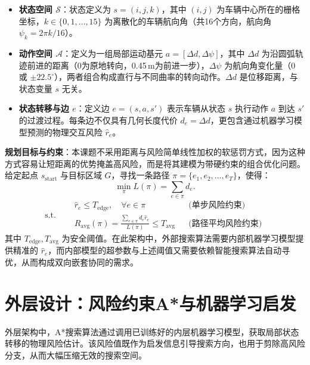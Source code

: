 \documentclass[12pt, a4paper]{article}
\begin{document}
\begin{itemize}
    \item \textbf{状态空间 \(\mathcal{S}\)}：状态定义为 \(s=(i, j, k)\)，其中 \((i,j)\) 为车辆中心所在的栅格坐标，\(k \in \{0, 1, \dots, 15\}\) 为离散化的车辆航向角（共16个方向，航向角 \(\psi_k = 2\pi k/16\)）。
    \item \textbf{动作空间 \(\mathcal{A}\)}：定义为一组局部运动基元 \(a = [\Delta d, \Delta \psi]\)，其中 \(\Delta d\) 为沿圆弧轨迹前进的距离（0为原地转向，0.45\,m为前进一步），\(\Delta \psi\) 为航向角变化量（\(0\) 或 \(\pm 22.5^{\circ}\)），两者组合构成直行与不同曲率的转向动作。\(\Delta d\) 是位移距离，与状态变量 \(s\) 无关。
    \item \textbf{状态转移与边 \(e\)}：定义边 \(e = (s, a, s')\) 表示车辆从状态 \(s\) 执行动作 \(a\) 到达 \(s'\) 的过渡过程。每条边不仅具有几何长度代价 \(d_e = \Delta d\)，更包含通过机器学习模型预测的物理交互风险 \(\hat{r}_e\)。
\end{itemize}

\textbf{规划目标与约束}：本课题不采用距离与风险简单线性加权的软惩罚方式，因为这种方式容易让短距离的优势掩盖高风险，而是将其建模为带硬约束的组合优化问题。给定起点 \(s_{\text{start}}\) 与目标区域 \(G\)，寻找一条路径 \(\pi = \{e_1, e_2, \dots, e_T\}\)，使得：
\begin{equation}
    \min_{\pi} L(\pi) = \sum_{e \in \pi} d_e.
\end{equation}
\[
\text{s.t.} \quad
\begin{aligned}
    &\hat{r}_e \le T_{\text{edge}}, \quad \forall e \in \pi &&\text{(单步风险约束)} \\
    &R_{\text{avg}}(\pi) = \frac{\sum_{e \in \pi} d_e \hat{r}_e}{L(\pi)} \le T_{\text{avg}} &&\text{(路径平均风险约束)}
\end{aligned}
\]
其中 \(T_{\text{edge}}, T_{\text{avg}}\) 为安全阈值。在此架构中，外部搜索算法需要内部机器学习模型提供精准的 \(\hat{r}_e\)，而内部模型的超参数与上述阈值又需要依赖智能搜索算法自动寻优，从而构成双向嵌套协同的需求。


\section{外层设计：风险约束A*与机器学习启发}

外层架构中，A*搜索算法通过调用已训练好的内层机器学习模型，获取局部状态转移的物理风险估计。该风险值既作为启发信息引导搜索方向，也用于剪除高风险分支，从而大幅压缩无效的搜索空间。
\end{document}
